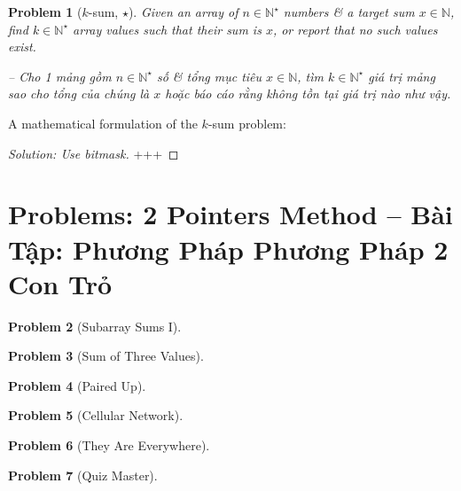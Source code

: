 \documentclass{article}
\newtheorem{problem}{Problem}
\begin{document}
\begin{problem}[$k$-sum, $\star$]
    Given an array of $n\in\mathbb{N}^\star$ numbers \& a target sum $x\in\mathbb{N}$, find $k\in\mathbb{N}^\star$ array values such that their sum is $x$, or report that no such values exist.

    -- Cho 1 mảng gồm $n\in\mathbb{N}^\star$ số \& tổng mục tiêu $x\in\mathbb{N}$, tìm $k\in\mathbb{N}^\star$ giá trị mảng sao cho tổng của chúng là $x$ hoặc báo cáo rằng không tồn tại giá trị nào như vậy.
\end{problem}
A mathematical formulation of the $k$-sum problem:
\begin{center}
\end{center}

\begin{proof}[Solution: Use bitmask]
    +++
\end{proof}


\section{Problems: 2 Pointers Method -- Bài Tập: Phương Pháp Phương Pháp 2 Con Trỏ}

\begin{problem}[Subarray Sums I]

\end{problem}

\begin{problem}[Sum of Three Values]

\end{problem}

\begin{problem}[Paired Up]

\end{problem}

\begin{problem}[Cellular Network]

\end{problem}

\begin{problem}[They Are Everywhere]

\end{problem}

\begin{problem}[Quiz Master]

\end{problem}
\end{document}
